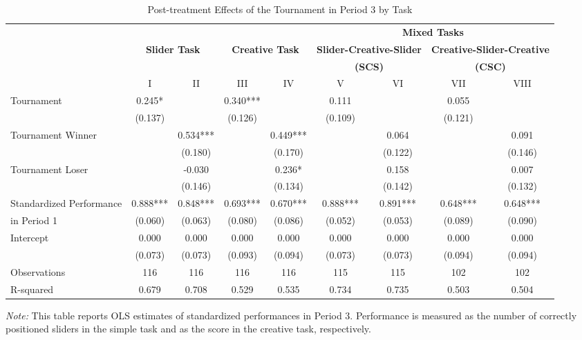 \begin{landscape}
\begin{table}[!htbp]
\caption{\label{tab:reg_spillover} Post-treatment  Effects of the Tournament in Period 3 by Task}%
\begin{center}%
{\small\renewcommand{\arraystretch}{0.7}%
\begin{tabular}{lcccccccc}
\hline\hline\noalign{\smallskip}
  & & & & & \multicolumn{4}{c}{\bf Mixed Tasks} \\
 	&   \multicolumn{2}{c}{\bf Slider Task} & \multicolumn{2}{c}{\bf Creative Task} &\multicolumn{2}{c}{\bf Slider-Creative-Slider} & \multicolumn{2}{c}{\bf Creative-Slider-Creative} \\
 & & & & & \multicolumn{2}{c}{\bf (SCS)} & \multicolumn{2}{c}{\bf (CSC)}\\	
 & I & II & III & IV & V & VI & VII & VIII \\
\hline\noalign{\smallskip}
Tournament & 0.245* &  & 0.340*** &  & 0.111 &  & 0.055 &  \\
 & (0.137) &  & (0.126) &  &  (0.109)&  & (0.121) &  \\[2mm]
Tournament Winner &  & 0.534*** &  & 0.449*** &  & 0.064 &  & 0.091 \\
 &  & (0.180) &  & (0.170) &  & (0.122) &  & (0.146) \\[2mm]
Tournament Loser &  & -0.030 &  & 0.236* &  & 0.158 &  & 0.007 \\
 &  & (0.146) &  & (0.134) &  & (0.142) &  & (0.132) \\[2mm]
Standardized Performance & 0.888*** & 0.848*** & 0.693*** & 0.670*** & 0.888*** & 0.891*** & 0.648*** & 0.648*** \\
in Period 1 & (0.060) & (0.063) & (0.080) & (0.086) & (0.052) & (0.053) & (0.089) & (0.090) \\ [2mm]
Intercept & 0.000 & 0.000 & 0.000 & 0.000 & 0.000 & 0.000 & 0.000 & 0.000 \\
 & (0.073) & (0.073) & (0.093) & (0.094) & (0.073) & (0.073) & (0.094) & (0.094) \\[2mm]
\hline\noalign{\smallskip}
Observations & 116 & 116 & 116 & 116 & 115 & 115 & 102 & 102 \\
 R-squared & 0.679 & 0.708 & 0.529 & 0.535 & 0.734 & 0.735 & 0.503 & 0.504 \\
\hline\hline
\end{tabular}}
\begin{minipage}{1.2\textwidth}
\footnotesize
\vspace{5mm}
{\it Note:} This table reports OLS estimates of standardized performances in Period 3. Performance is measured as the number of correctly positioned sliders in the simple task and as the score in the creative task, respectively.\\ 

\end{minipage}
\end{center}
\end{table}
\end{landscape}
